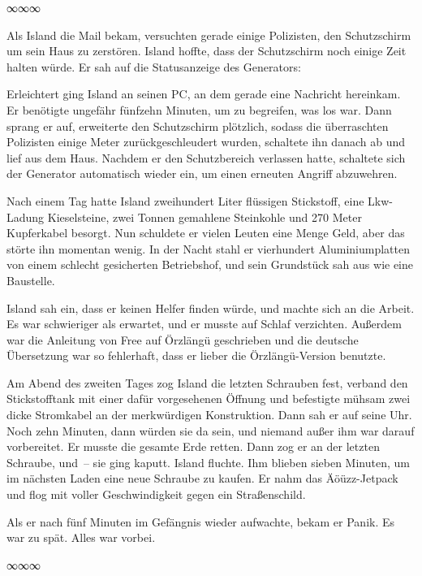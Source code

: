 \begin{center}
    ∞∞∞
\end{center}

Als Island die Mail bekam, versuchten gerade einige Polizisten, den Schutzschirm um sein Haus zu zerstören. Island hoffte, dass der Schutzschirm noch einige Zeit halten würde. Er sah auf die Statusanzeige des Generators: 

Erleichtert ging Island an seinen PC, an dem gerade eine Nachricht hereinkam. Er benötigte ungefähr fünfzehn Minuten, um zu begreifen, was los war. Dann sprang er auf, erweiterte den Schutzschirm plötzlich, sodass die überraschten Polizisten einige Meter zurückgeschleudert wurden, schaltete ihn danach ab und lief aus dem Haus. Nachdem er den Schutzbereich verlassen hatte, schaltete sich der Generator automatisch wieder ein, um einen erneuten Angriff abzuwehren.

Nach einem Tag hatte Island zweihundert Liter flüssigen Stickstoff, eine Lkw-Ladung Kieselsteine, zwei Tonnen gemahlene Steinkohle und 270 Meter Kupferkabel besorgt. Nun schuldete er vielen Leuten eine Menge Geld, aber das störte ihn momentan wenig. In der Nacht stahl er vierhundert Aluminiumplatten von einem schlecht gesicherten Betriebshof, und sein Grundstück sah aus wie eine Baustelle.

Island sah ein, dass er keinen Helfer finden würde, und machte sich an die Arbeit. Es war schwieriger als erwartet, und er musste auf Schlaf verzichten. Außerdem war die Anleitung von Free auf Örzlängü geschrieben und die deutsche Übersetzung war so fehlerhaft, dass er lieber die Örzlängü-Version benutzte.

Am Abend des zweiten Tages zog Island die letzten Schrauben fest, verband den Stickstofftank mit einer dafür vorgesehenen Öffnung und befestigte mühsam zwei dicke Stromkabel an der merkwürdigen Konstruktion. Dann sah er auf seine Uhr. Noch zehn Minuten, dann würden sie da sein, und niemand außer ihm war darauf vorbereitet. Er musste die gesamte Erde retten. Dann zog er an der letzten Schraube, und~– sie ging kaputt. Island fluchte. Ihm blieben sieben Minuten, um im nächsten Laden eine neue Schraube zu kaufen. Er nahm das Äöüzz-Jetpack und flog mit voller Geschwindigkeit gegen ein Straßenschild.

Als er nach fünf Minuten im Gefängnis wieder aufwachte, bekam er Panik. Es war zu spät. Alles war vorbei.

\begin{center}
    ∞∞∞
\end{center}

